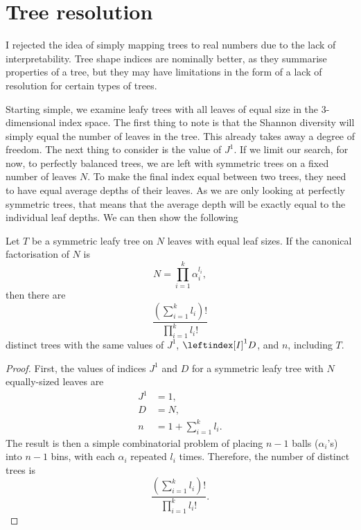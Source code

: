\section{Tree resolution}

I rejected the idea of simply mapping trees to real numbers due to the lack of
interpretability. Tree shape indices are nominally better, as they summarise
properties of a tree, but they may have limitations in the form of a lack of
resolution for certain types of trees. \par
Starting simple, we examine leafy trees with all leaves of equal size in the
$3$-dimensional index space. The first thing to note is that the Shannon
diversity will simply equal the number of leaves in the tree. This already takes
away a degree of freedom. The next thing to consider is the value of $J^1$. If
we limit our search, for now, to perfectly balanced trees, we are left with
symmetric trees on a fixed number of leaves $N$. To make the final index equal
between two trees, they need to have equal average depths of their leaves. As we
are only looking at perfectly symmetric trees, that means that the average depth
will be exactly equal to the individual leaf depths. We can then show the
following
\begin{proposition}
    Let $T$ be a symmetric leafy tree on $N$ leaves with equal leaf sizes. If
    the canonical factorisation of $N$ is
    \begin{equation}
        N = \prod_{i=1}^k \alpha_i^{l_i},
    \end{equation}
    then there are
    \begin{equation}
            \frac{\left(\sum^k_{i=1}l_i\right)!}{\prod_{i=1}^k l_i!}
    \end{equation}
    distinct trees with the same values of $J^1$, $\leftindex[I]^1{D}$, and $n$,
    including $T$.
\end{proposition}
\begin{proof}
    First, the values of indices $J^1$ and $D$ for a symmetric leafy tree with
    $N$ equally-sized leaves are
    \begin{align*}
        J^1 &= 1, \\
        D &= N, \\
        n &= 1 + \sum_{i=1}^k l_i.
    \end{align*}
    The result is then a simple combinatorial problem of placing $n-1$ balls
    ($\alpha_i$'s) into $n-1$ bins, with each $\alpha_i$ repeated $l_i$ times.
    Therefore, the number of distinct trees is
    \begin{equation}
        \frac{\left(\sum^k_{i=1}l_i\right)!}{\prod_{i=1}^k l_i!}.
    \end{equation}
\end{proof}

